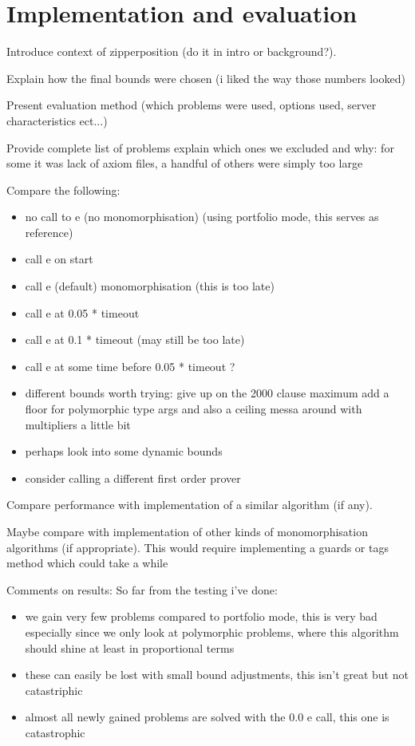 \documentclass{article}
\begin{document}
\section{Implementation and evaluation}

Introduce context of zipperposition (do it in intro or background?).

Explain how the final bounds were chosen (i liked the way those numbers looked)

Present evaluation method (which problems were used, options used, server characteristics ect...)



Provide complete list of problems explain which ones we excluded and why: for some it was lack of axiom files, a handful of others were simply too large

Compare the following:
    \begin{itemize}
        \item no call to e (no monomorphisation) (using portfolio mode, this serves as reference)
        \item call e on start
        \item call e (default) monomorphisation (this is too late)
        \item call e at 0.05 * timeout
        \item call e at 0.1 * timeout (may still be too late)
        \item call e at some time before 0.05 * timeout ?
        \item different bounds worth trying: give up on the 2000 clause maximum
              add a floor for polymorphic type args and also a ceiling 
              messa around with multipliers a little bit
         \item perhaps look into some dynamic bounds
         \item consider calling a different first order prover
    \end{itemize}

Compare performance with implementation of a similar algorithm (if any).

Maybe compare with implementation of other kinds of monomorphisation algorithms (if appropriate). This would require implementing a guards or tags method which could take a while

Comments on results:
So far from the testing i've done:
\begin{itemize}
   \item we gain very few problems compared to portfolio mode, this is very bad especially since we only look at polymorphic problems, where this algorithm should shine at least in proportional terms
   \item these can easily be lost with small bound adjustments, this isn't great but not catastriphic
   \item almost all newly gained problems are solved with the 0.0 e call, this one is catastrophic
\end{itemize}
\end{document}
